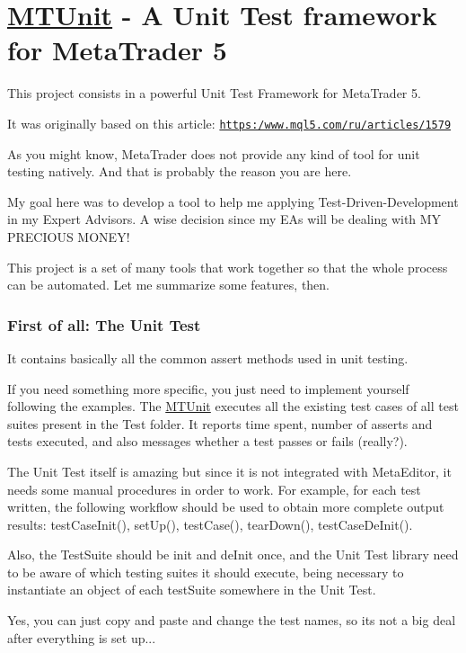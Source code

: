 \section*{\mbox{\hyperlink{class_m_t_unit}{M\+T\+Unit}} -\/ A Unit Test framework for Meta\+Trader 5}

This project consists in a powerful Unit Test Framework for Meta\+Trader 5.

It was originally based on this article\+: \href{https:/www.mql5.com/ru/articles/1579}{\tt https\+:/www.\+mql5.\+com/ru/articles/1579}

As you might know, Meta\+Trader does not provide any kind of tool for unit testing natively. And that is probably the reason you are here.

My goal here was to develop a tool to help me applying Test-\/\+Driven-\/\+Development in my Expert Advisors. A wise decision since my E\+As will be dealing with MY P\+R\+E\+C\+I\+O\+US M\+O\+N\+E\+Y!

This project is a set of many tools that work together so that the whole process can be automated. Let me summarize some features, then.

\subsubsection*{First of all\+: The Unit Test}

It contains basically all the common assert methods used in unit testing.

If you need something more specific, you just need to implement yourself following the examples. The \mbox{\hyperlink{class_m_t_unit}{M\+T\+Unit}} executes all the existing test cases of all test suites present in the Test folder. It reports time spent, number of asserts and tests executed, and also messages whether a test passes or fails (really?).

The Unit Test itself is amazing but since it is not integrated with Meta\+Editor, it needs some manual procedures in order to work. For example, for each test written, the following workflow should be used to obtain more complete output results\+: test\+Case\+Init(), set\+Up(), test\+Case(), tear\+Down(), test\+Case\+De\+Init().

Also, the Test\+Suite should be init and de\+Init once, and the Unit Test library need to be aware of which testing suites it should execute, being necessary to instantiate an object of each test\+Suite somewhere in the Unit Test.

Yes, you can just copy and paste and change the test names, so it\textquotesingle{}s not a big deal after everything is set up...

